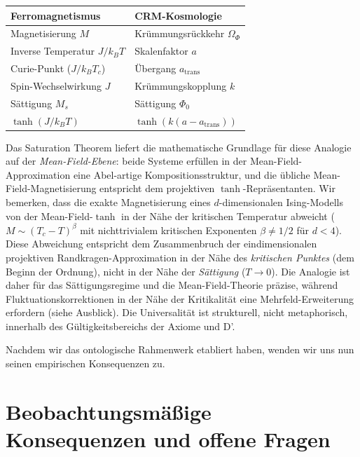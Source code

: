 \documentclass[aps,prd,twocolumn,superscriptaddress,nofootinbib]{revtex4-2}
\begin{document}
\begin{center}
\begin{tabular}{ll}
\hline
Ferromagnetismus & CRM-Kosmologie \\
\hline
Magnetisierung $M$ & Krümmungsrückkehr $\Omega_\Phi$ \\
Inverse Temperatur $J/k_BT$ & Skalenfaktor $a$ \\
Curie-Punkt ($J/k_BT_c$) & Übergang $a_{\mathrm{trans}}$ \\
Spin-Wechselwirkung $J$ & Krümmungskopplung $k$ \\
Sättigung $M_s$ & Sättigung $\Phi_0$ \\
$\tanh(J/k_BT)$ & $\tanh(k(a - a_{\mathrm{trans}}))$ \\
\hline
\end{tabular}
\end{center}

Das Saturation Theorem liefert die mathematische Grundlage für diese Analogie auf der \textit{Mean-Field-Ebene}: beide Systeme erfüllen in der Mean-Field-Approximation eine Abel-artige Kompositionsstruktur, und die übliche Mean-Field-Magnetisierung entspricht dem projektiven $\tanh$-Repräsentanten. Wir bemerken, dass die exakte Magnetisierung eines $d$-dimensionalen Ising-Modells von der Mean-Field-$\tanh$ in der Nähe der kritischen Temperatur abweicht ($M \sim (T_c - T)^{\beta}$ mit nichttrivialem kritischen Exponenten $\beta \neq 1/2$ für $d < 4$). Diese Abweichung entspricht dem Zusammenbruch der eindimensionalen projektiven Randkragen-Approximation in der Nähe des \textit{kritischen Punktes} (dem Beginn der Ordnung), nicht in der Nähe der \textit{Sättigung} ($T \to 0$). Die Analogie ist daher für das Sättigungsregime und die Mean-Field-Theorie präzise, während Fluktuationskorrektionen in der Nähe der Kritikalität eine Mehrfeld-Erweiterung erfordern (siehe Ausblick). Die Universalität ist strukturell, nicht metaphorisch, innerhalb des Gültigkeitsbereichs der Axiome und D'.

Nachdem wir das ontologische Rahmenwerk etabliert haben, wenden wir uns nun seinen empirischen Konsequenzen zu.

\section{Beobachtungsmäßige Konsequenzen und offene Fragen}
\label{sec:observational}
\end{document}
